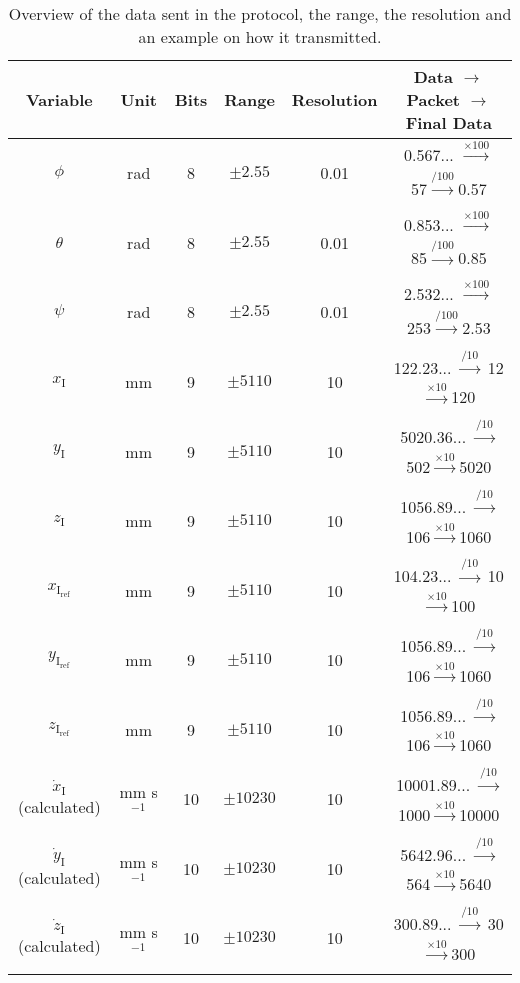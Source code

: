 \begin{table}[H]
    \centering
    \begin{tabular}{|c|c|c|c|c|c|}
        \hline
        Variable      &  Unit       &  Bits     & Range 	   & Resolution 	  & Data $\rightarrow$ Packet $\rightarrow$ Final Data		 \\ \hline
        $\phi$         & rad	 &	8    & $\pm 2.55$ & 0.01 & 0.567... $\xrightarrow[]{\times 100}$ 57$\xrightarrow[]{/ 100}$0.57\\ \hline
        $\theta$       & rad	&	8    & $\pm 2.55$ & 0.01 & 0.853... $\xrightarrow[]{\times 100}$ 85$\xrightarrow[]{/ 100}$0.85\\ \hline
        $\psi$         & rad	&	8    & $\pm 2.55$ & 0.01 & 2.532... $\xrightarrow[]{\times 100}$ 253$\xrightarrow[]{/ 100}$2.53\\ \hline
        $x_{\mathrm{I}}$         & mm	&  9  & $\pm 5110$ & 10  & 122.23... $\xrightarrow[]{/ 10}$ 12$\xrightarrow[]{\times 10}$120\\ \hline
        $y_{\mathrm{I}}$         & mm	&9	    & $\pm 5110$ & 10 & 5020.36... $\xrightarrow[]{/ 10}$ 502$\xrightarrow[]{\times 10}$5020\\ \hline
        $z_{\mathrm{I}}$         & mm	&   9     & $\pm 5110$ & 10 & 1056.89... $\xrightarrow[]{/ 10}$ 106$\xrightarrow[]{\times 10}$1060\\ \hline
        $x_{\mathrm{I_{ref}}}$     & mm	&9	    & $\pm 5110$ & 10 & 104.23... $\xrightarrow[]{/ 10}$ 10$\xrightarrow[]{\times 10}$100\\ \hline
        $y_{\mathrm{I_{ref}}}$     & mm	& 9   & $\pm 5110$ & 10 &  1056.89... $\xrightarrow[]{/ 10}$ 106$\xrightarrow[]{\times 10}$1060\\ \hline
        $z_{\mathrm{I_{ref}}}$     & mm 	&9	    & $\pm 5110$ & 10 & 1056.89... $\xrightarrow[]{/ 10}$ 106$\xrightarrow[]{\times 10}$1060\\ \hline
        $\dot{x}_{\mathrm{I}}$ (calculated)  & mm s$^{-1}$		 &  10 & $\pm 10230$ & 10 & 10001.89... $\xrightarrow[]{/ 10}$ 1000$\xrightarrow[]{\times 10}$10000\\ \hline
        $\dot{y}_{\mathrm{I}}$ (calculated)  & 	mm s$^{-1}$	&  10  & $\pm 10230$ & 10 & 5642.96... $\xrightarrow[]{/ 10}$ 564$\xrightarrow[]{\times 10}$5640\\ \hline
        $\dot{z}_{\mathrm{I}}$ (calculated)  & 	mm s$^{-1}$	&  10  & $\pm 10230$ & 10 & 300.89... $\xrightarrow[]{/ 10}$ 30$\xrightarrow[]{\times 10}$300\\ \hline        
    \end{tabular}
    \caption{Overview of the data sent in the protocol, the range, the resolution and an example on how it transmitted.}
    \label{tab:data}
\end{table}

